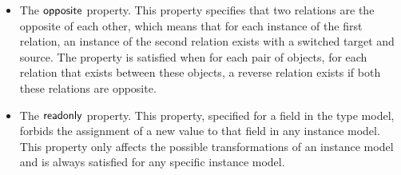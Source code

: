 \begin{itemize}
\item The $\mathsf{opposite}$ property. This property specifies that two relations are the opposite of each other, which means that for each instance of the first relation, an instance of the second relation exists with a switched target and source. The property is satisfied when for each pair of objects, for each relation that exists between these objects, a reverse relation exists if both these relations are opposite.

\item The $\mathsf{readonly}$ property. This property, specified for a field in the type model, forbids the assignment of a new value to that field in any instance model. This property only affects the possible transformations of an instance model and is always satisfied for any specific instance model.
\end{itemize}

